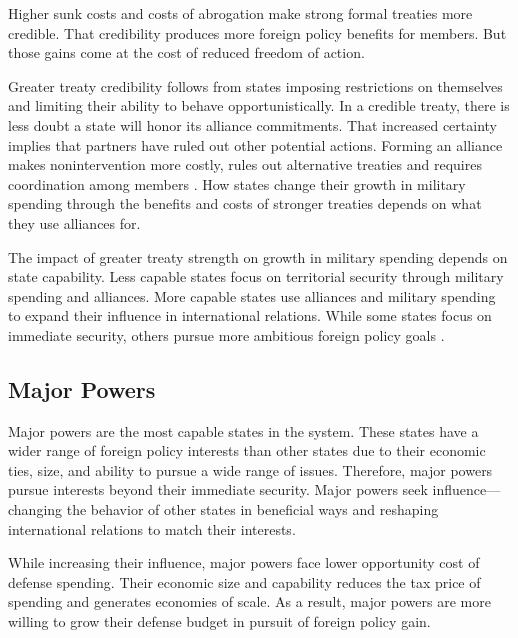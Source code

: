 \documentclass[12pt]{article}
\begin{document}
Higher sunk costs and costs of abrogation make strong formal treaties more credible.
That credibility produces more foreign policy benefits for members. 
But those gains come at the cost of reduced freedom of action. 


Greater treaty credibility follows from states imposing restrictions on themselves and limiting their ability to behave opportunistically. 
In a credible treaty, there is less doubt a state will honor its alliance commitments. 
That increased certainty implies that partners have ruled out other potential actions. 
Forming an alliance makes nonintervention more costly, rules out alternative treaties and requires coordination among members \citep{Snyder1997}. 
How states change their growth in military spending through the benefits and costs of stronger treaties depends on what they use alliances for. 


The impact of greater treaty strength on growth in military spending depends on state capability. 
Less capable states focus on territorial security through military spending and alliances. 
More capable states use alliances and military spending to expand their influence in international relations. 
While some states focus on immediate security, others pursue more ambitious foreign policy goals \citep{Fordham2011, MarkowitzFariss2017}. 


\subsection{Major Powers} 


Major powers are the most capable states in the system. 
These states have a wider range of foreign policy interests than other states due to their economic ties, size, and ability to pursue a wide range of issues. 
Therefore, major powers pursue interests beyond their immediate security. 
Major powers seek influence--- changing the behavior of other states in beneficial ways and reshaping international relations to match their interests. 


While increasing their influence, major powers face lower opportunity cost of defense spending. 
Their economic size and capability reduces the tax price of spending and generates economies of scale. 
As a result, major powers are more willing to grow their defense budget in pursuit of foreign policy gain.  
\end{document}
